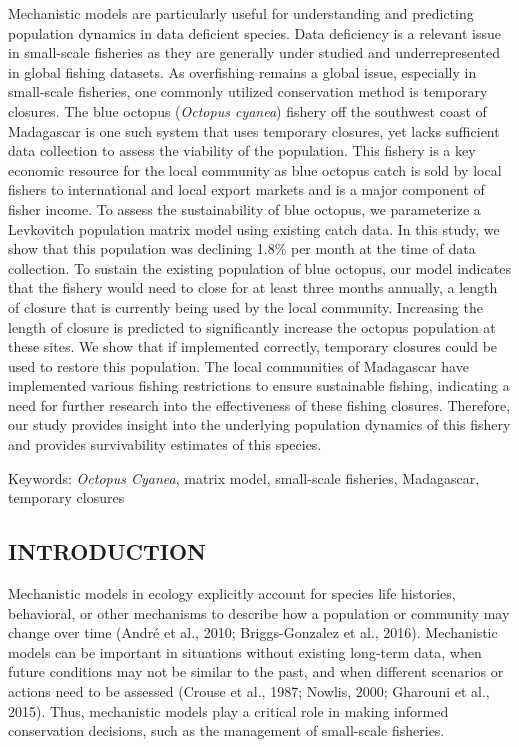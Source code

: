 \documentclass[
]{article}
\begin{document}
Mechanistic models are particularly useful for understanding and predicting population dynamics in data deficient species. Data deficiency is a relevant issue in small-scale fisheries as they are generally under studied and underrepresented in global fishing datasets. As overfishing remains a global issue, especially in small-scale fisheries, one commonly utilized conservation method is temporary closures. The blue octopus (\emph{Octopus cyanea}) fishery off the southwest coast of Madagascar is one such system that uses temporary closures, yet lacks sufficient data collection to assess the viability of the population. This fishery is a key economic resource for the local community as blue octopus catch is sold by local fishers to international and local export markets and is a major component of fisher income. To assess the sustainability of blue octopus, we parameterize a Levkovitch population matrix model using existing catch data. In this study, we show that this population was declining 1.8\% per month at the time of data collection. To sustain the existing population of blue octopus, our model indicates that the fishery would need to close for at least three months annually, a length of closure that is currently being used by the local community. Increasing the length of closure is predicted to significantly increase the octopus population at these sites. We show that if implemented correctly, temporary closures could be used to restore this population. The local communities of Madagascar have implemented various fishing restrictions to ensure sustainable fishing, indicating a need for further research into the effectiveness of these fishing closures. Therefore, our study provides insight into the underlying population dynamics of this fishery and provides survivability estimates of this species.

Keywords: \emph{Octopus Cyanea}, matrix model, small-scale fisheries, Madagascar, temporary closures

\hypertarget{introduction-1}{%
\subsection{INTRODUCTION}\label{introduction-1}}

Mechanistic models in ecology explicitly account for species life histories, behavioral, or other mechanisms to describe how a population or community may change over time (André et al., 2010; Briggs-Gonzalez et al., 2016). Mechanistic models can be important in situations without existing long-term data, when future conditions may not be similar to the past, and when different scenarios or actions need to be assessed (Crouse et al., 1987; Nowlis, 2000; Gharouni et al., 2015). Thus, mechanistic models play a critical role in making informed conservation decisions, such as the management of small-scale fisheries.
\end{document}

